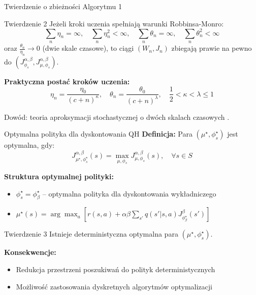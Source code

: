 \begin{frame}{Twierdzenie o zbieżności Algorytmu 1}
\begin{block}{Twierdzenie 2 \cite{eshwar2025}}
Jeżeli kroki uczenia spełniają warunki Robbinsa-Monro:
\[
\sum_n \eta_n = \infty, \quad \sum_n \eta_n^2 < \infty, \quad \sum_n \theta_n = \infty, \quad \sum_n \theta_n^2 < \infty
\]
oraz $\frac{\theta_n}{\eta_n} \to 0$ (dwie skale czasowe), to ciągi $(W_n, J_n)$ zbiegają prawie na pewno do $(J^{\alpha, \beta}_{\phi_s}, J^{\alpha, \beta}_{\mu, \phi_s})$.
\end{block}

\vspace{0.5em}
\textbf{Praktyczna postać kroków uczenia:}
\[
\eta_n = \frac{\eta_0}{(c + n)^{\kappa}}, \quad
\theta_n = \frac{\theta_0}{(c + n)^{\lambda}}, \quad
\frac{1}{2} < \kappa < \lambda \le 1
\]

{\small Dowód: teoria aproksymacji stochastycznej o dwóch skalach czasowych \cite{borkar2008}.}
\end{frame}

\begin{frame}{Optymalna polityka dla dyskontowania QH}
\textbf{Definicja:} Para $(\mu^\star, \phi_s^\star)$ jest optymalna, gdy:
\[
J^{\alpha, \beta}_{\mu^\star, \phi_s^\star}(s) = \max_{\mu, \phi_s} J^{\alpha, \beta}_{\mu, \phi_s}(s), \quad \forall s \in S
\]

\vspace{0.5em}
\textbf{Struktura optymalnej polityki:}
\begin{itemize}
    \item $\phi_s^\star = \phi_\beta^\star$ -- optymalna polityka dla dyskontowania wykładniczego
    \item $\mu^\star(s) = \arg\max_a \left[ r(s, a) + \alpha \beta \sum_{s'} q(s'|s, a) J^{\beta}_{\phi_\beta^\star}(s') \right]$
\end{itemize}

\vspace{0.5em}
\begin{block}{Twierdzenie 3 \cite{eshwar2025}}
Istnieje deterministyczna optymalna para $(\mu^\star, \phi_s^\star)$.
\end{block}

\vspace{0.3em}
\textbf{Konsekwencje:}
\begin{itemize}
    \item Redukcja przestrzeni poszukiwań do polityk deterministycznych
    \item Możliwość zastosowania dyskretnych algorytmów optymalizacji
\end{itemize}
\end{frame}

